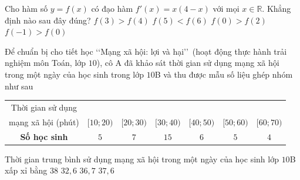 \begin{ex}%
	Cho hàm số $y=f(x)$ có đạo hàm $f'(x)=x(4-x)$ với mọi $x\in\mathbb{R}$. Khẳng định nào sau đây đúng?
	\choice
	{$f(3)>f(4)$}
	{$f(5)<f(6)$}
	{$f(0)>f(2)$}
	{\True $f(-1)>f(0)$}
\end{ex}

\begin{ex}%
	Để chuẩn bị cho tiết học \lq\lq Mạng xã hội: lợi và hại\rq\rq\, (hoạt động thực hành trải nghiệm môn Toán, lớp $10$), cô A đã khảo sát thời gian sử dụng mạng xã hội trong một ngày của học sinh trong lớp $10$B và thu được mẫu số liệu ghép nhóm như sau
	\begin{center}
		\begin{tabular}{|c|c|c|c|c|c|c|}
			\hline
			Thời gian sử dụng \\  mạng xã hội (phút) & $[10; 20)$ & $[20; 30)$ & $[30; 40)$ & $[40; 50)$ & $[50; 60)$ & $[60; 70)$ \\
			\hline
			\textbf{Số học sinh} & $5$ & $7$ & $15$ & $6$ & $5$ & $4$ \\
			\hline
		\end{tabular}
	\end{center}
	Thời gian trung bình sử dụng mạng xã hội trong một ngày của học sinh lớp $10$B xấp xỉ bằng
	\choice
	{$38$}
	{$32{,}6$}
	{$36{,}7$}
	{\True $37{,}6$}
\end{ex}

